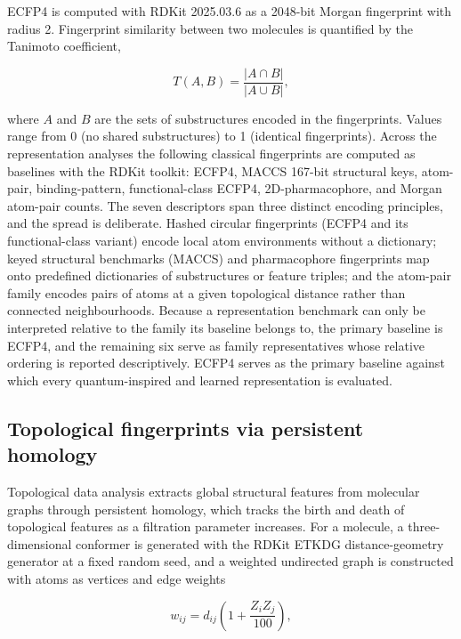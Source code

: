 ECFP4 is computed with RDKit 2025.03.6 as a \num{2048}-bit Morgan fingerprint with radius \num{2}. Fingerprint similarity between two molecules is quantified by the Tanimoto coefficient,

\begin{equation}
T(A, B) = \frac{\left| A \cap B \right|}{\left| A \cup B \right|},
\end{equation}

where $A$ and $B$ are the sets of substructures encoded in the fingerprints. Values range from \num{0} (no shared substructures) to \num{1} (identical fingerprints). Across the representation analyses the following classical fingerprints are computed as baselines with the RDKit toolkit\cite{LandrumRDKit}: ECFP4, MACCS \num{167}-bit structural keys, atom-pair, binding-pattern, functional-class ECFP4, 2D-pharmacophore, and Morgan atom-pair counts. The seven descriptors span three distinct encoding principles, and the spread is deliberate. Hashed circular fingerprints (ECFP4 and its functional-class variant) encode local atom environments without a dictionary; keyed structural benchmarks (MACCS) and pharmacophore fingerprints map onto predefined dictionaries of substructures or feature triples; and the atom-pair family encodes pairs of atoms at a given topological distance rather than connected neighbourhoods. Because a representation benchmark can only be interpreted relative to the family its baseline belongs to, the primary baseline is ECFP4, and the remaining six serve as family representatives whose relative ordering is reported descriptively. ECFP4 serves as the primary baseline against which every quantum-inspired and learned representation is evaluated.

\subsection{Topological fingerprints via persistent homology}\label{sec:tfp_methods}

Topological data analysis extracts global structural features from molecular graphs through persistent homology, which tracks the birth and death of topological features as a filtration parameter increases. For a molecule, a three-dimensional conformer is generated with the RDKit ETKDG distance-geometry generator\cite{Riniker2015} at a fixed random seed, and a weighted undirected graph is constructed with atoms as vertices and edge weights

\begin{equation}
w_{ij} = d_{ij} \left( 1 + \frac{Z_i Z_j}{100} \right),
\end{equation}

